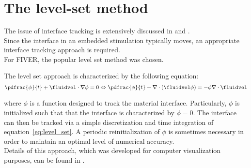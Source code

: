 \documentclass[../main.tex]{subfiles}
\begin{document}
\section{The level-set method}\label{sec:interface_tracking}

The issue of interface tracking is extensively discussed in \cite{Wang2012} and \cite{Fedkiw2003}.\\

Since the interface in an embedded stimulation typically moves, an appropriate interface tracking approach is required.\\
For \ac{FIVER}, the popular level set method \cite{Sethian1999} was chosen.

The level set approach is characterized by the following equation:
\begin{align}\label{eq:level_set}
\pdfrac{\phi}{t}+\fluidvel\cdot\nabla\phi=0 \Leftrightarrow \pdfrac{\phi}{t}+\nabla\cdot(\fluidvel\phi)=-\phi\nabla\cdot\fluidvel
\end{align}

where $\phi$ is a function designed to track the material interface. Particularly, $\phi$ is initialized such that that the interface is characterized by $\phi=0$. The interface can then be tracked via a simple discretization and time integration of equation~\eqref{eq:level_set}.
A periodic reinitialization of $\phi$ is sometimes necessary in order to maintain an optimal level of numerical accuracy.\\ 
Details of this approach, which was developed for computer visualization purposes, can be found in \cite{Sethian1999}.
\end{document}
